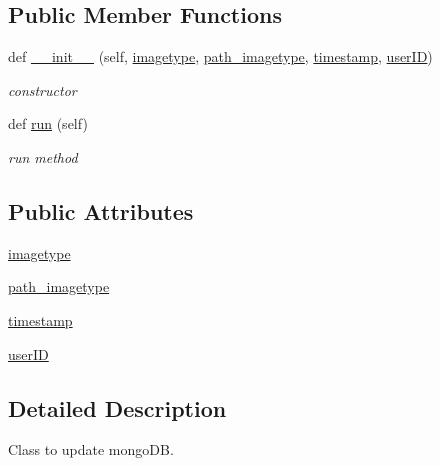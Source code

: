 \subsection*{Public Member Functions}
\begin{DoxyCompactItemize}
\item 
def \hyperlink{classimgapp_1_1uploadThreadClass_1_1UpdateMongo__Thread_a0d30cc67a2651315da4ad8314267950d}{\+\_\+\+\_\+init\+\_\+\+\_\+} (self, \hyperlink{classimgapp_1_1uploadThreadClass_1_1UpdateMongo__Thread_abdcc11ca39117e4be69529f9c7bfb3bc}{imagetype}, \hyperlink{classimgapp_1_1uploadThreadClass_1_1UpdateMongo__Thread_ad1fdfd12c9880d6f71ccc132b1b25c48}{path\+\_\+imagetype}, \hyperlink{classimgapp_1_1uploadThreadClass_1_1UpdateMongo__Thread_a5bed01b8c20a83542f7f3c252620b487}{timestamp}, \hyperlink{classimgapp_1_1uploadThreadClass_1_1UpdateMongo__Thread_add91c794afac49dd490c18263c69703b}{user\+ID})
\begin{DoxyCompactList}\small\item\em constructor \end{DoxyCompactList}\item 
def \hyperlink{classimgapp_1_1uploadThreadClass_1_1UpdateMongo__Thread_a2d84f80c27c2d8107166ff4aa3551c70}{run} (self)
\begin{DoxyCompactList}\small\item\em run method \end{DoxyCompactList}\end{DoxyCompactItemize}
\subsection*{Public Attributes}
\begin{DoxyCompactItemize}
\item 
\hyperlink{classimgapp_1_1uploadThreadClass_1_1UpdateMongo__Thread_abdcc11ca39117e4be69529f9c7bfb3bc}{imagetype}
\item 
\hyperlink{classimgapp_1_1uploadThreadClass_1_1UpdateMongo__Thread_ad1fdfd12c9880d6f71ccc132b1b25c48}{path\+\_\+imagetype}
\item 
\hyperlink{classimgapp_1_1uploadThreadClass_1_1UpdateMongo__Thread_a5bed01b8c20a83542f7f3c252620b487}{timestamp}
\item 
\hyperlink{classimgapp_1_1uploadThreadClass_1_1UpdateMongo__Thread_add91c794afac49dd490c18263c69703b}{user\+ID}
\end{DoxyCompactItemize}


\subsection{Detailed Description}
Class to update mongo\+DB. 

